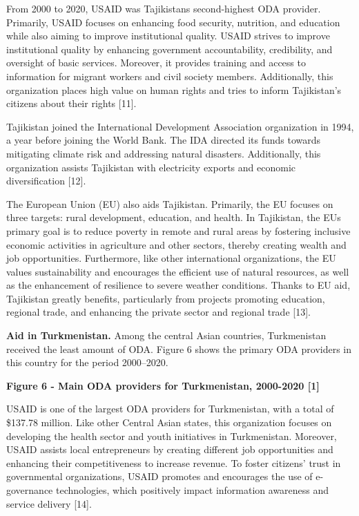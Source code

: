 From 2000 to 2020, USAID was Tajikistan\textquotesingle s second-highest
ODA provider. Primarily, USAID focuses on enhancing food security,
nutrition, and education while also aiming to improve institutional
quality. USAID strives to improve institutional quality by enhancing
government accountability, credibility, and oversight of basic services.
Moreover, it provides training and access to information for migrant
workers and civil society members. Additionally, this organization
places high value on human rights and tries to inform Tajikistan's
citizens about their rights {[}11{]}.

Tajikistan joined the International Development Association organization
in 1994, a year before joining the World Bank. The IDA directed its
funds towards mitigating climate risk and addressing natural disasters.
Additionally, this organization assists Tajikistan with electricity
exports and economic diversification {[}12{]}.

The European Union (EU) also aids Tajikistan. Primarily, the EU focuses
on three targets: rural development, education, and health. In
Tajikistan, the EU\textquotesingle s primary goal is to reduce poverty
in remote and rural areas by fostering inclusive economic activities in
agriculture and other sectors, thereby creating wealth and job
opportunities. Furthermore, like other international organizations, the
EU values sustainability and encourages the efficient use of natural
resources, as well as the enhancement of resilience to severe weather
conditions. Thanks to EU aid, Tajikistan greatly benefits, particularly
from projects promoting education, regional trade, and enhancing the
private sector and regional trade {[}13{]}.

{\bfseries Aid in Turkmenistan.} Among the central Asian countries,
Turkmenistan received the least amount of ODA. Figure 6 shows the
primary ODA providers in this country for the period 2000--2020.

{\bfseries Figure 6 - Main ODA providers for Turkmenistan, 2000-2020
{[}1{]}}

USAID is one of the largest ODA providers for Turkmenistan, with a total
of \$137.78 million. Like other Central Asian states, this organization
focuses on developing the health sector and youth initiatives in
Turkmenistan. Moreover, USAID assists local entrepreneurs by creating
different job opportunities and enhancing their competitiveness to
increase revenue. To foster citizens' trust in governmental
organizations, USAID promotes and encourages the use of e-governance
technologies, which positively impact information awareness and service
delivery {[}14{]}.

